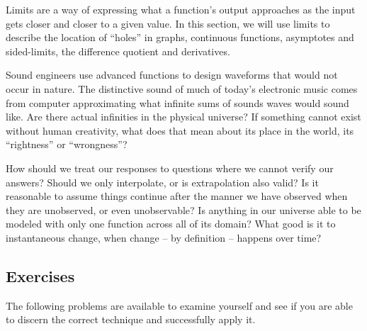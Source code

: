 


Limits are a way of expressing what a function's output approaches as the input gets
closer and closer to a given value.  In this section, we will use limits to describe the 
location of ``holes'' in graphs, continuous functions, asymptotes and sided-limits, 
the difference quotient and derivatives.

Sound engineers use advanced functions to design waveforms that would not occur in nature.
The distinctive sound of much of today's electronic music comes from computer approximating
what infinite sums of sounds waves would sound like.  Are there actual infinities in the physical
universe?  If something cannot exist without human creativity, what does that mean about its
place in the world, its ``rightness'' or ``wrongness''?


How should we treat our responses to questions where we cannot verify our answers?
Should we only interpolate, or is extrapolation also valid?  Is it reasonable to assume
things continue after the manner we have observed when they are unobserved, or even
unobservable?  Is anything in our universe able to be modeled with only one function across
all of its domain? What good is it to instantaneous change, when change -- by definition --
happens over time?



\newpage
\chapterminitoc

\newpage
{}
\newpage

\newpage
\subsection{Exercises}
The following problems are available to examine yourself
and see if you are able to discern the correct technique and successfully apply it.
~\vfill



